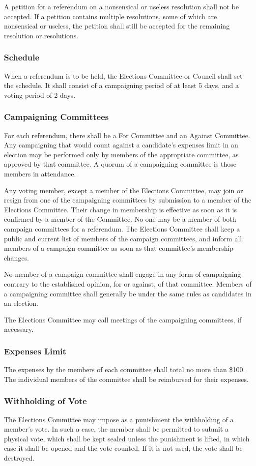 A petition for a referendum on a nonsensical or useless resolution shall not be accepted.
If a petition contains multiple resolutions, some of which are nonsensical or useless, the petition shall still be accepted for the remaining
resolution or resolutions.

\subsubsection{Schedule}
When a referendum is to be held, the Elections Committee or Council shall set the schedule.
It shall consist of a campaigning period of at least 5 days, and a voting period of 2 days.

\subsubsection{Campaigning Committees}
For each referendum, there shall be a For Committee and an Against Committee.
Any campaigning that would count against a candidate's expenses limit in an election may be performed only by members of the appropriate committee, as approved by that committee.
A quorum of a campaigning committee is those members in attendance.

Any voting member, except a member of the Elections Committee, may join or resign from one of the campaigning committees by submission to a member of the Elections Committee.
Their change in membership is effective as soon as it is confirmed by a member of the Committee.
No one may be a member of both campaign committees for a referendum.
The Elections Committee shall keep a public and current list of members of the campaign committees, and inform all members of a campaign committee as soon as that committee's membership changes.

No member of a campaign committee shall engage in any form of campaigning contrary to the established opinion, for or against, of that committee.
Members of a campaigning committee shall generally be under the same rules as candidates in an election.

The Elections Committee may call meetings of the campaigning committees, if necessary.

\subsubsection{Expenses Limit}
The expenses by the members of each committee shall total no more than \$100.
The individual members of the committee shall be reimbursed for their expenses.

\subsubsection{Withholding of Vote}
The Elections Committee may impose as a punishment the withholding of a member's vote.
In such a case, the member shall be permitted to submit a physical vote, which shall be kept sealed unless the punishment is lifted, in which case it shall be opened and the vote counted.
If it is not used, the vote shall be destroyed.
